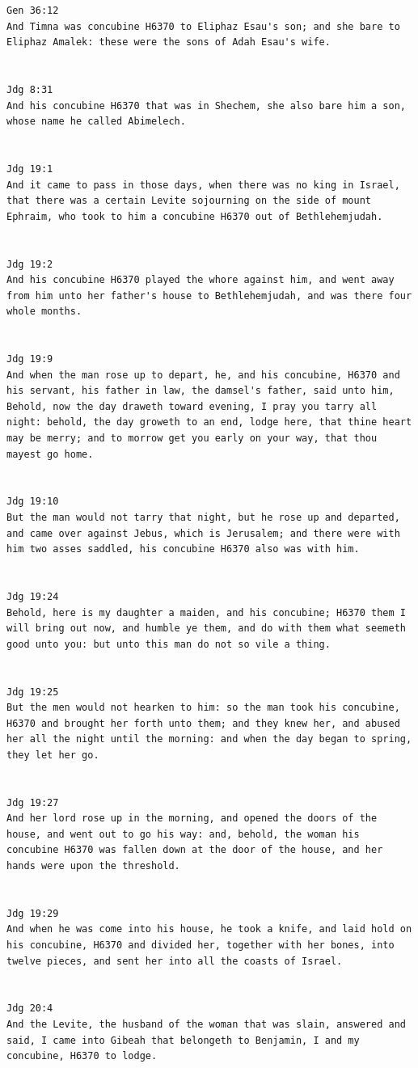 \documentclass[11pt]{article}
\begin{document}
{\begin{lstlisting}
Gen 36:12
And Timna was concubine H6370 to Eliphaz Esau's son; and she bare to Eliphaz Amalek: these were the sons of Adah Esau's wife.


Jdg 8:31
And his concubine H6370 that was in Shechem, she also bare him a son, whose name he called Abimelech.


Jdg 19:1
And it came to pass in those days, when there was no king in Israel, that there was a certain Levite sojourning on the side of mount Ephraim, who took to him a concubine H6370 out of Bethlehemjudah.


Jdg 19:2
And his concubine H6370 played the whore against him, and went away from him unto her father's house to Bethlehemjudah, and was there four whole months.


Jdg 19:9
And when the man rose up to depart, he, and his concubine, H6370 and his servant, his father in law, the damsel's father, said unto him, Behold, now the day draweth toward evening, I pray you tarry all night: behold, the day groweth to an end, lodge here, that thine heart may be merry; and to morrow get you early on your way, that thou mayest go home.


Jdg 19:10
But the man would not tarry that night, but he rose up and departed, and came over against Jebus, which is Jerusalem; and there were with him two asses saddled, his concubine H6370 also was with him.


Jdg 19:24
Behold, here is my daughter a maiden, and his concubine; H6370 them I will bring out now, and humble ye them, and do with them what seemeth good unto you: but unto this man do not so vile a thing.


Jdg 19:25
But the men would not hearken to him: so the man took his concubine, H6370 and brought her forth unto them; and they knew her, and abused her all the night until the morning: and when the day began to spring, they let her go.


Jdg 19:27
And her lord rose up in the morning, and opened the doors of the house, and went out to go his way: and, behold, the woman his concubine H6370 was fallen down at the door of the house, and her hands were upon the threshold.


Jdg 19:29
And when he was come into his house, he took a knife, and laid hold on his concubine, H6370 and divided her, together with her bones, into twelve pieces, and sent her into all the coasts of Israel.


Jdg 20:4
And the Levite, the husband of the woman that was slain, answered and said, I came into Gibeah that belongeth to Benjamin, I and my concubine, H6370 to lodge.



\end{lstlisting}}
\end{document}
